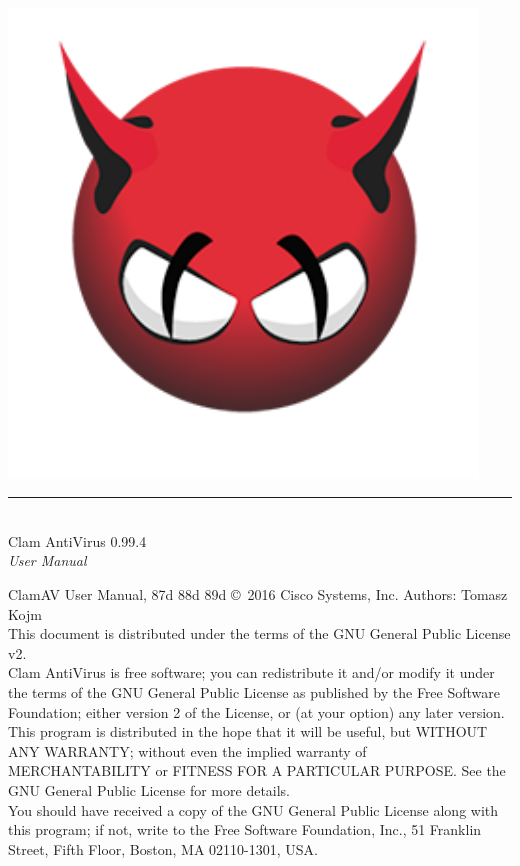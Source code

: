 \documentclass[a4paper,titlepage,12pt]{article}
\date{}
\begin{document}
    \setcounter{page}{0}

    \pagestyle{empty}
    \includegraphics[width=353pt]{html/demon.png}
    \vspace{3cm}
    \begin{flushright}
	\rule[-1ex]{8cm}{3pt}\\
	\huge Clam AntiVirus 0.99.4\\
	\huge \emph{User Manual}\\
    \end{flushright}

    \newpage
    \pagestyle{fancy}
    \tableofcontents
    \vspace{1.0cm}

    \noindent
    \begin{boxedminipage}[b]{\textwidth}
    ClamAV User Manual,
87d
88d
89d
    \copyright \  2016 Cisco Systems, Inc.
    Authors: Tomasz Kojm\\
    This document is distributed under the terms of the GNU General
    Public License v2.\\

    Clam AntiVirus is free software; you can redistribute it and/or modify
    it under the terms of the GNU General Public License as published by
    the Free Software Foundation; either version 2 of the License, or
    (at your option) any later version.\\

    This program is distributed in the hope that it will be useful,
    but WITHOUT ANY WARRANTY; without even the implied warranty of
    MERCHANTABILITY or FITNESS FOR A PARTICULAR PURPOSE.  See the
    GNU General Public License for more details.\\

    You should have received a copy of the GNU General Public License
    along with this program; if not, write to the Free Software
    Foundation, Inc., 51 Franklin Street, Fifth Floor, Boston,
    MA 02110-1301, USA.
    \end{boxedminipage}
\end{document}

